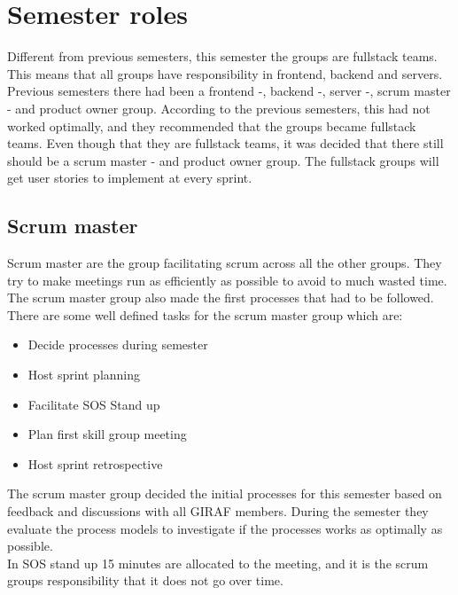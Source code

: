 \section{Semester roles}
Different from previous semesters, this semester the groups are fullstack teams. 
This means that all groups have responsibility in frontend, backend and servers.
Previous semesters there had been a frontend -, backend -, server -, scrum master - and product owner group. 
According to the previous semesters, this had not worked optimally, and they recommended that the groups became fullstack teams.
Even though that they are fullstack teams, it was decided that there still should be a scrum master - and product owner group. 
The fullstack groups will get user stories to implement at every sprint.

\subsection{Scrum master}
Scrum master are the group facilitating scrum across all the other groups.
They try to make meetings run as efficiently as possible to avoid to much wasted time.
The scrum master group also made the first processes that had to be followed.
\\
There are some well defined tasks for the scrum master group which are:
\begin{itemize}
    \item Decide processes during semester
    \item Host sprint planning
    \item Facilitate SOS Stand up
    \item Plan first skill group meeting
    \item Host sprint retrospective
\end{itemize}
\noindent
The scrum master group decided the initial processes for this semester based on feedback and discussions with all GIRAF members.
During the semester they evaluate the process models to investigate if the processes works as optimally as possible.
\\
In SOS stand up 15 minutes are allocated to the meeting, and it is the scrum groups responsibility that it does not go over time.


